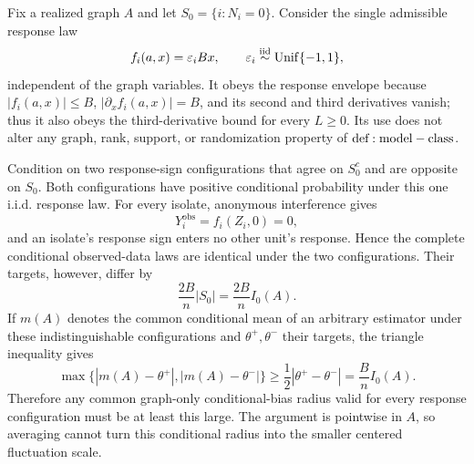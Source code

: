 Fix a realized graph \(A\) and let \(S_0=\{i:N_i=0\}\).  Consider the single admissible response law
\[
 f_i(a,x)=\varepsilon_iBx,
 \qquad \varepsilon_i\overset{\mathrm{iid}}\sim{\rm Unif}\{-1,1\},
\]
independent of the graph variables.  It obeys the response envelope because \(|f_i(a,x)|\leq B\), \(|\partial_xf_i(a,x)|=B\), and its second and third derivatives vanish; thus it also obeys the third-derivative bound for every \(L\geq0\).  Its use does not alter any graph, rank, support, or randomization property of \({\rm def:model-class}\).

Condition on two response-sign configurations that agree on \(S_0^c\) and are opposite on \(S_0\).  Both configurations have positive conditional probability under this one i.i.d. response law.  For every isolate, anonymous interference gives
\[
 Y_i^{\mathrm{obs}}=f_i(Z_i,0)=0,
\]
and an isolate's response sign enters no other unit's response.  Hence the complete conditional observed-data laws are identical under the two configurations.  Their targets, however, differ by
\[
 \frac{2B}{n}|S_0|=\frac{2B}{n}I_0(A).
\]
If \(m(A)\) denotes the common conditional mean of an arbitrary estimator under these indistinguishable configurations and \(\theta^+,\theta^-\) their targets, the triangle inequality gives
\[
 \max\{|m(A)-\theta^+|,|m(A)-\theta^-|\}
 \geq\frac12|\theta^+-\theta^-|
 =\frac{B}{n}I_0(A).
\]
Therefore any common graph-only conditional-bias radius valid for every response configuration must be at least this large.  The argument is pointwise in \(A\), so averaging cannot turn this conditional radius into the smaller centered fluctuation scale.
